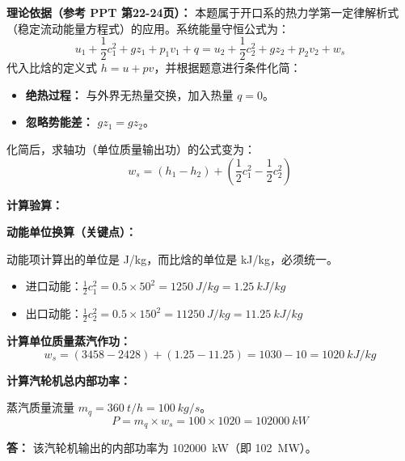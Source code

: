 \begin{solution}
\textbf{理论依据（参考 PPT 第22-24页）：} 本题属于开口系的热力学第一定律解析式（稳定流动能量方程式）的应用。系统能量守恒公式为：
\begin{equation*}
  u_1 + \frac{1}{2}c_1^2 + g z_1 + p_1 v_1 + q = u_2 + \frac{1}{2}c_2^2 + g z_2 + p_2 v_2 + w_s
\end{equation*}
代入比焓的定义式 \(h = u + pv\)，并根据题意进行条件化简：

\begin{itemize}
  \item \textbf{绝热过程：} 与外界无热量交换，加入热量 \(q = 0\)。
  \item \textbf{忽略势能差：} \(g z_1 = g z_2\)。
\end{itemize}

化简后，求轴功（单位质量输出功）的公式变为：
\begin{equation*}
  w_s = (h_1 - h_2) + \left(\frac{1}{2}c_1^2 - \frac{1}{2}c_2^2\right)
\end{equation*}

\textbf{计算验算：}

\textbf{动能单位换算（关键点）：}

动能项计算出的单位是 \unit{J/kg}，而比焓的单位是 \unit{kJ/kg}，必须统一。

\begin{itemize}
  \item 进口动能：\(\frac{1}{2}c_1^2 = 0.5 \times 50^2 = \qty{1250}{J/kg} = \qty{1.25}{kJ/kg}\)
  \item 出口动能：\(\frac{1}{2}c_2^2 = 0.5 \times 150^2 = \qty{11250}{J/kg} = \qty{11.25}{kJ/kg}\)
\end{itemize}

\textbf{计算单位质量蒸汽作功：}
\begin{equation*}
  w_s = (3458 - 2428) + (1.25 - 11.25) = 1030 - 10 = \qty{1020}{kJ/kg}
\end{equation*}

\textbf{计算汽轮机总内部功率：}

蒸汽质量流量 \(m_q = \qty{360}{t/h} = \qty{100}{kg/s}\)。
\begin{equation*}
  P = m_q \times w_s = 100 \times 1020 = \qty{102000}{kW}
\end{equation*}

\textbf{答：} 该汽轮机输出的内部功率为 \qty{102000}{kW}（即 \qty{102}{MW}）。
\end{solution}
